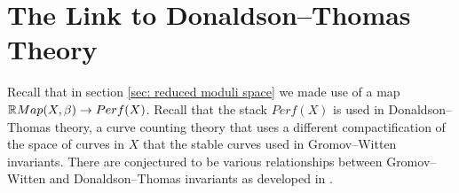 

\section{The Link to Donaldson--Thomas Theory}

Recall that in section \ref{sec: reduced moduli space} we made use of a map $\mathbb R Map (X,\beta)\rightarrow Perf(X) $.  Recall that the stack $Perf(X)$ is used in Donaldson--Thomas theory, a curve counting theory that uses a different compactification of the space of curves in $X$ that the stable curves used in Gromov--Witten invariants.  There are conjectured to be various relationships between Gromov--Witten and Donaldson--Thomas invariants as developed in \cite{maulik2006gromovI, maulik2006gromovII}.


